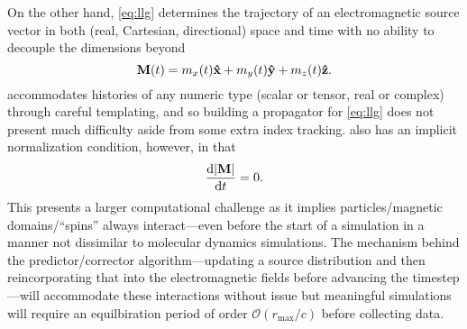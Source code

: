 On the other hand, \cref{eq:llg} determines the trajectory of an electromagnetic source vector in both (real, Cartesian, directional) space and time with no ability to decouple the dimensions beyond
\begin{equation}
  \vb{M}(t) = m_x(t) \vu{x} + m_y(t) \vu{y} + m_z(t) \vu{z}.
\end{equation}
\QuEST{} accommodates histories of any numeric type (scalar or tensor, real or complex) through careful templating, and so building a propagator for \cref{eq:llg} does not present much difficulty aside from some extra index tracking.
 also has an implicit normalization condition, however, in that
\begin{equation}
  \dv{\abs{\vb{M}}}{t} = 0.
\end{equation}
This presents a larger computational challenge as it implies particles/magnetic domains/``spins'' always interact---even before the start of a simulation in a manner not dissimilar to molecular dynamics simulations.
The mechanism behind the predictor/corrector algorithm---updating a source distribution and then reincorporating that into the electromagnetic fields before advancing the timestep---will accommodate these interactions without issue but meaningful simulations will require an equilbiration period of order $\mathcal{O}(r_\text{max}/c)$ before collecting data.
